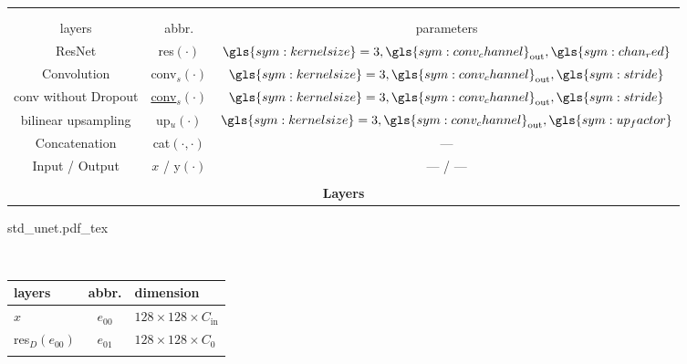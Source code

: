 \begin{center}
	\begin{minipage}{0.5\textwidth}
		\centering
		\begin{tabular}{c|c|c}
			\multicolumn{3}{c}{}             \\			
			\multicolumn{3}{c}{}             \\				
			layers & abbr. & parameters \\
			\hline
			\textcolor[rgb]{0.2,0.4,0.8}{ResNet} & res$(\cdot)$ & $\gls{sym:kernelsize}=3, \gls{sym:conv_channel}_{\text{out}}, \gls{sym:chan_red}$ \\
			\textcolor[rgb]{0.18,0.76,0.49}{Convolution} & \gls{conv}$_s(\cdot)$ & $\gls{sym:kernelsize}=3, \gls{sym:conv_channel}_{\text{out}}, \gls{sym:stride}$\\
			\textcolor[rgb]{0.18,0.76,0.49}{\gls{conv} without Dropout} & \underline{\gls{conv}}$_s(\cdot)$ & $\gls{sym:kernelsize}=3, \gls{sym:conv_channel}_{\text{out}}, \gls{sym:stride}$\\		
			\textcolor[rgb]{0.57,0.25,0.67}{bilinear upsampling} & up$_u(\cdot)$ & $\gls{sym:kernelsize}=3 ,\gls{sym:conv_channel}_{\text{out}}, \gls{sym:up_factor}$\\
			Concatenation & cat$(\cdot ,\cdot)$ & ---\\
			Input / \textcolor[rgb]{1.0,0.4,0.0}{Output} & $x$ / y$(\cdot)$& --- / ---\\
			\multicolumn{3}{c}{}             \\					
			\multicolumn{3}{c}{\textbf{Layers}}             \\
		\end{tabular}
	\end{minipage}
	\hfill
	\begin{minipage}{0.47\textwidth}
		\begin{center}
			{std_unet.pdf_tex}
		\end{center}
	\end{minipage}\\
	\begin{minipage}{0.4\textwidth}
		\centering
		\begin{tabular}{l|c|l}
			layers & abbr. & dimension\\
			\hline
			$x$ & $e_{00}$ & $128 \times 128 \times C_\text{in}$\\	
			res$_D(e_{00})$ & $e_{01}$ & $128 \times 128 \times C_0$\\
			&&                                                       \\

\end{tabular}
\end{minipage}
\end{center}
